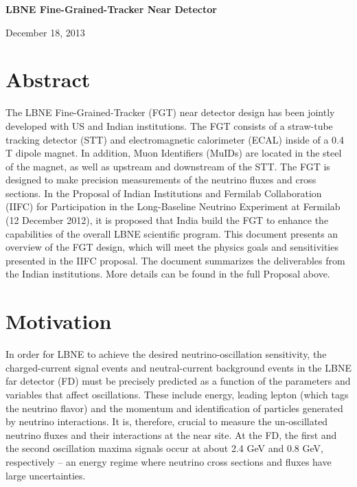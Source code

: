 \documentclass[aps,prl,preprint,groupedaddress]{revtex4}
\begin{document}
%

\centerline{\bf LBNE Fine-Grained-Tracker Near Detector}
\smallskip
\centerline{December 18, 2013}

\bigskip

\section{Abstract}

The LBNE Fine-Grained-Tracker (FGT) near detector design has been jointly
developed with US and Indian institutions. The FGT consists of a straw-tube
tracking detector (STT) and electromagnetic calorimeter (ECAL) inside of a 0.4 T
dipole magnet. In addition, Muon Identifiers (MuIDs) are located in the
steel of the magnet, as well as upstream and downstream of the STT. The FGT
is designed to make precision measurements of the neutrino fluxes and 
cross sections. 
In the Proposal of Indian Institutions and Fermilab Collaboration (IIFC) for Participation in 
the Long-Baseline Neutrino Experiment at Fermilab 
(12 December 2012), it is proposed that India build the FGT to enhance the capabilities of the 
overall LBNE scientific program. 
This document presents an overview of the FGT design, which 
will meet the physics goals and sensitivities presented in the IIFC proposal. The document 
summarizes the deliverables from the Indian institutions. More details can be found in the full Proposal above.

\section{Motivation}

In order for LBNE to achieve the desired neutrino-oscillation sensitivity, the 
charged-current signal events
and neutral-current
background events in the LBNE far detector (FD) must be precisely 
predicted as a function of the parameters and variables that affect 
oscillations. These include energy, leading lepton (which tags the neutrino flavor) and the 
momentum and identification of particles generated by neutrino interactions. 
It is, therefore, crucial to measure the un-oscillated neutrino fluxes and 
their interactions at the near site. At the FD, the first and the second 
oscillation maxima signals occur at about 2.4 GeV and 0.8 GeV, respectively 
-- an energy regime where neutrino cross sections and fluxes have large 
uncertainties. 
\end{document}
